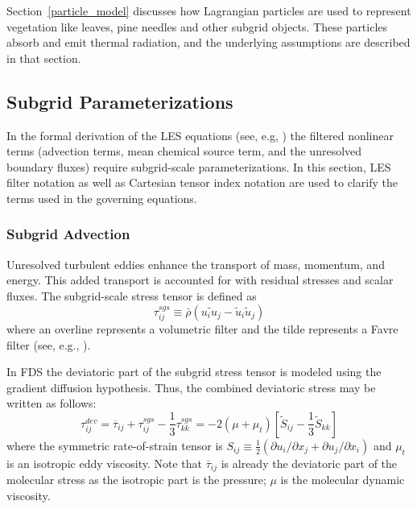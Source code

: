 \documentclass[journal,article,atmosphere,submit,moreauthors,pdftex]{Definitions/mdpi}
\begin{document}
Section~\ref{particle_model} discusses how Lagrangian particles are used to represent vegetation like leaves, pine needles and other subgrid objects. These particles absorb and emit thermal radiation, and the underlying assumptions are described in that section.

\subsection{Subgrid Parameterizations} \label{sec:subgrid}

In the formal derivation of the LES equations (see, e.g, \cite{Pope:2000,FDS_Math_Guide}) the filtered nonlinear terms (advection terms, mean chemical source term, and the unresolved boundary fluxes) require subgrid-scale parameterizations.  In this section, LES filter notation as well as Cartesian tensor index notation are used to clarify the terms used in the governing equations.

\subsubsection{Subgrid Advection}

Unresolved turbulent eddies enhance the transport of mass, momentum, and energy.  This added transport is accounted for with residual stresses and scalar fluxes.  The subgrid-scale stress tensor is defined as
\begin{equation}
\tau_{ij}^{sgs} \equiv \bar{\rho}(\widetilde{u_i u_j} - \tilde{u}_i \tilde{u}_j)
\end{equation}
where an overline represents a volumetric filter and the tilde represents a Favre filter (see, e.g., \cite{Poinsot:TNC}).

In FDS the deviatoric part of the subgrid stress tensor is modeled using the gradient diffusion hypothesis.  Thus, the combined deviatoric stress may be written as follows:
\begin{equation}
\tau_{ij}^{dev} = \overline{\tau}_{ij} + \tau_{ij}^{sgs} - \frac{1}{3} \tau_{kk}^{sgs} = -2 (\mu + \mu_t) \left[ \tilde{S}_{ij} - \frac{1}{3} \tilde{S}_{kk} \right]
\end{equation}
where the symmetric rate-of-strain tensor is $S_{ij} \equiv \frac{1}{2}(\partial u_i/\partial x_j + \partial u_j/\partial x_i)$ and $\mu_t$ is an isotropic eddy viscosity.  Note that $\overline{\tau}_{ij}$ is already the deviatoric part of the molecular stress as the isotropic part is the pressure; $\mu$ is the molecular dynamic viscosity.
\end{document}
